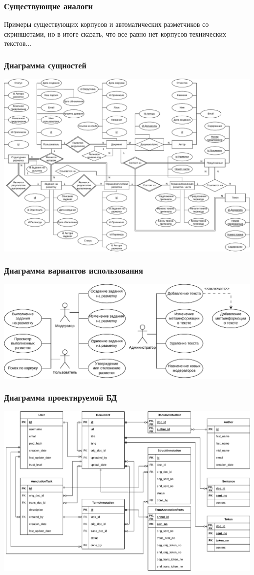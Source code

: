 \documentclass{beamer}
\begin{document}
\begin{frame}
    \frametitle{Существующие аналоги}
    Примеры существующих корпусов и автоматических разметчиков со скриншотами, но в итоге сказать, что все равно нет корпусов технических текстов...
\end{frame}

\begin{frame}
    \frametitle{Диаграмма сущностей}
    \centering
	\includegraphics[width=\textwidth]{diag/chen-v9.pdf}
\end{frame}

\begin{frame}
    \frametitle{Диаграмма вариантов использования}
    \centering
	\includegraphics[width=\textwidth]{diag/use-case-v2.pdf}
\end{frame}

\begin{frame}
    \frametitle{Диаграмма проектируемой БД}
    \centering
	\includegraphics[width=\textwidth]{diag/erd-v3.pdf}
\end{frame}
\end{document}
